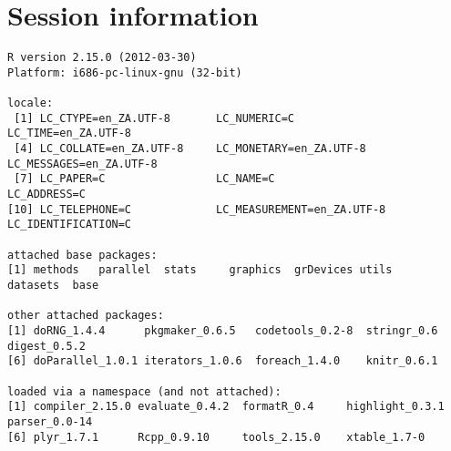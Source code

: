 \documentclass[a4paper,12pt]{article}\usepackage{graphicx, color}
\makeatletter
\newenvironment{kframe}{%
 \def\FrameCommand##1{\hskip\@totalleftmargin \hskip-\fboxsep
 \colorbox{shadecolor}{##1}\hskip-\fboxsep
     \hskip-\linewidth \hskip-\@totalleftmargin \hskip\columnwidth}%
 \MakeFramed {\advance\hsize-\width
   \@totalleftmargin\z@ \linewidth\hsize
   \@setminipage}}%
 {\par\unskip\endMakeFramed}
\newenvironment{knitrout}{}{} %
\renewenvironment{knitrout}{\begin{footnotesize}}{\end{footnotesize}}
\makeatother
\begin{document}
\section*{Session information}
\begin{knitrout}
\color{fgcolor}\begin{kframe}
\begin{verbatim}
R version 2.15.0 (2012-03-30)
Platform: i686-pc-linux-gnu (32-bit)

locale:
 [1] LC_CTYPE=en_ZA.UTF-8       LC_NUMERIC=C               LC_TIME=en_ZA.UTF-8       
 [4] LC_COLLATE=en_ZA.UTF-8     LC_MONETARY=en_ZA.UTF-8    LC_MESSAGES=en_ZA.UTF-8   
 [7] LC_PAPER=C                 LC_NAME=C                  LC_ADDRESS=C              
[10] LC_TELEPHONE=C             LC_MEASUREMENT=en_ZA.UTF-8 LC_IDENTIFICATION=C       

attached base packages:
[1] methods   parallel  stats     graphics  grDevices utils     datasets  base     

other attached packages:
[1] doRNG_1.4.4      pkgmaker_0.6.5   codetools_0.2-8  stringr_0.6      digest_0.5.2    
[6] doParallel_1.0.1 iterators_1.0.6  foreach_1.4.0    knitr_0.6.1     

loaded via a namespace (and not attached):
[1] compiler_2.15.0 evaluate_0.4.2  formatR_0.4     highlight_0.3.1 parser_0.0-14  
[6] plyr_1.7.1      Rcpp_0.9.10     tools_2.15.0    xtable_1.7-0   
\end{verbatim}
\end{kframe}
\end{knitrout}


\printbibliography[heading=bibintoc]
\end{document}
